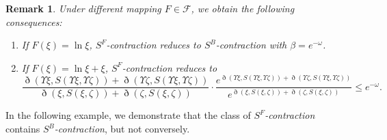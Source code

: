 \documentclass[pdflatex,sn-mathphys-num]{sn-jnl}%
\theoremstyle{thmstyleone}%
\theoremstyle{thmstyletwo}%
\newtheorem{remark}{Remark}%
\theoremstyle{thmstylethree}%
\begin{document}
\begin{remark}\label{remark1} Under different mapping $F \in \mathcal{F}$, we obtain the following consequences:
    \begin{enumerate}
        \item [1.] If $F(\xi)=\ln \xi $, \textit{$S^F$-contraction} reduces to \textit{$S^B$-contraction} with $\beta=e^{-\omega  }$.
        \item[2.]  If $F(\xi)=\ln \xi  +\xi$, \textit{$S^F$-contraction} reduces to
        \begin{equation*}
            \frac{\eth(\Upsilon \xi,S(\Upsilon \xi,\Upsilon \zeta))+\eth(\Upsilon \zeta,S(\Upsilon \xi,\Upsilon \zeta))}{\eth(\xi,S(\xi,\zeta))+\eth(\zeta ,S(\xi,\zeta))}\cdot\frac{e^{\eth(\Upsilon \xi,S(\Upsilon \xi,\Upsilon \zeta))+\eth(\Upsilon \zeta,S(\Upsilon \xi,\Upsilon \zeta))}}{e^{\eth(\xi,S(\xi,\zeta))+\eth(\zeta ,S(\xi,\zeta))}}\le e^{-\omega  }.
        \end{equation*}
    \end{enumerate}
\end{remark}

In the following example, we demonstrate that the class of \textit{$S^F$-contraction} contains \textit{$S^B$-contraction}, but not conversely.
\end{document}
